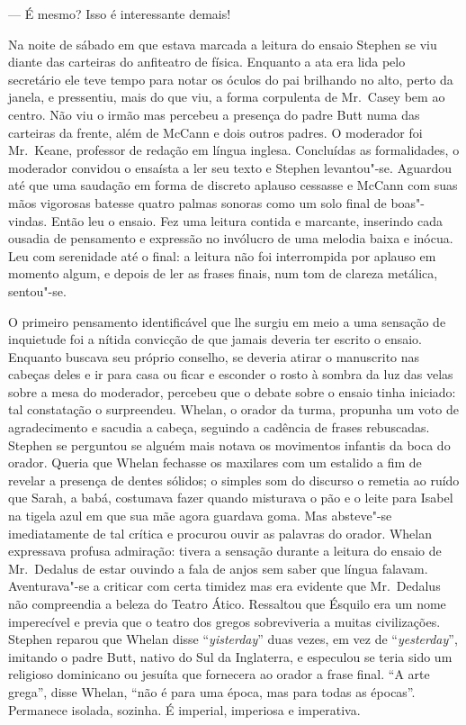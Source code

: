 --- É mesmo?  Isso é interessante demais!

Na noite de sábado em que estava marcada a leitura do ensaio Stephen se viu
diante das carteiras do anfiteatro de física.  Enquanto a ata era lida pelo
secretário ele teve tempo para notar os óculos do pai brilhando no alto, perto
da janela, e pressentiu, mais do que viu, a forma corpulenta de Mr.~Casey bem
ao centro.  Não viu o irmão mas percebeu a presença do padre Butt numa das
carteiras da frente, além de McCann e dois outros padres.  O moderador foi 
Mr.~Keane, professor de redação em língua inglesa.  Concluídas as formalidades, o
moderador convidou o ensaísta a ler seu texto e Stephen levantou"-se.  Aguardou
até que uma saudação em forma de discreto aplauso cessasse e McCann \label{com"-suas} com suas
mãos vigorosas batesse quatro palmas sonoras como um solo final de
boas"-vindas.  Então leu o ensaio.  Fez uma leitura contida e marcante,
inserindo cada ousadia de pensamento e expressão no invólucro de uma melodia
baixa e inócua.  Leu com serenidade até o final: a leitura não foi interrompida
por aplauso em momento algum, e depois de ler as frases finais, num tom de
clareza metálica, sentou"-se.

O primeiro pensamento identificável que lhe surgiu em meio a uma sensação de
inquietude foi a nítida convicção de que jamais deveria ter escrito o ensaio.
Enquanto buscava seu próprio conselho, se deveria atirar o \label{manuscrito"-nas} manuscrito nas
cabeças deles e ir para casa ou ficar e esconder o rosto à sombra da luz das
velas sobre a mesa do moderador, percebeu que o debate sobre o ensaio tinha
iniciado: tal constatação o surpreendeu.  Whelan, o orador da turma,		
propunha um voto de agradecimento e sacudia a cabeça, seguindo a cadência de
frases rebuscadas.  Stephen se perguntou se alguém mais notava os movimentos
infantis da boca do orador.  Queria que Whelan fechasse os maxilares com um
estalido a fim de revelar a presença de dentes sólidos; o simples som do
discurso o remetia ao ruído que Sarah, a babá, costumava fazer quando misturava
o pão e o leite para Isabel na tigela azul em que sua mãe agora guardava goma.
Mas absteve"-se imediatamente de tal crítica e procurou ouvir as palavras do
orador.  Whelan expressava profusa admiração: tivera a sensação
durante a leitura do ensaio de Mr.~Dedalus de estar ouvindo a fala de anjos
sem saber que língua falavam.  Aventurava"-se a criticar com certa timidez mas
era evidente que Mr.~Dedalus não compreendia a beleza do Teatro Ático.
Ressaltou que Ésquilo era um nome imperecível e previa que o teatro dos gregos
sobreviveria a muitas civilizações.  Stephen reparou que Whelan disse
“\textit{yisterday}” duas vezes, em vez de “\textit{yesterday}”, imitando o
padre Butt, nativo do Sul da Inglaterra, e especulou se teria sido um religioso
dominicano ou jesuíta que fornecera ao orador a frase final.  “A arte grega”,
disse Whelan, “não é para uma época, mas para todas as épocas”.  Permanece
isolada, sozinha.  É \label{imperial"-imperiosa} imperial, imperiosa e imperativa.

